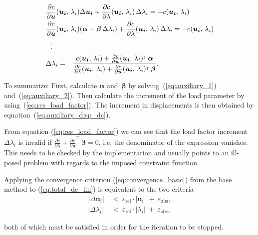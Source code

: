 %
\begin{align}
&\frac{\partial c}{\partial \boldsymbol{u}}(\boldsymbol{u_{i}},\,\lambda_{i})\Delta\boldsymbol{u_{i}} + \frac{\partial c}{\partial \lambda}(\boldsymbol{u_{i}},\,\lambda_{i})\,\Delta \lambda_{i} = -c(\boldsymbol{u_{i}},\,\lambda_{i})\notag\\
&\frac{\partial c}{\partial \boldsymbol{u}}(\boldsymbol{u_{i}},\,\lambda_{i})(\boldsymbol{\alpha} + \boldsymbol{\beta}\,\Delta \lambda_{i}) + \frac{\partial c}{\partial \lambda}(\boldsymbol{u_{i}},\,\lambda_{i})\,\Delta \lambda_{i} = -c(\boldsymbol{u_{i}},\,\lambda_{i})\notag\\
&\ \ \vdots\notag\\
&\Delta \lambda_{i} = -\frac{c(\boldsymbol{u_{i}},\,\lambda_{i}) + \frac{\partial c}{\partial \boldsymbol{u}}(\boldsymbol{u_{i}},\,\lambda_{i})^\intercal\,\boldsymbol{\alpha}}{\frac{\partial c}{\partial \lambda}(\boldsymbol{u_{i}},\,\lambda_{i}) + \frac{\partial c}{\partial \boldsymbol{u}}(\boldsymbol{u_{i}},\,\lambda_{i})^\intercal\,\boldsymbol{\beta}}.\label{eq:res_load_factor}
\end{align}

To summarize: First, calculate $\boldsymbol{\alpha}$ and~$\boldsymbol{\beta}$ by solving~(\ref{eq:auxiliary_1}) and~(\ref{eq:auxiliary_2}). Then calculate the increment of the load parameter by using~(\ref{eq:res_load_factor}). The increment in displacements is then obtained by equation~(\ref{eq:auxiliary_disp_dc}).

From equation (\ref{eq:res_load_factor}) we can see that the load factor increment $\Delta \lambda_{i}$ is invalid if $\frac{\partial c}{\partial \lambda} + \frac{\partial c}{\partial \boldsymbol{u}}^\intercal\,\boldsymbol{\beta} = 0$, i.e. the denominator of the expression vanishes.
This needs to be checked by the implementation and usually points to an ill-posed problem with regards to the imposed constraint function.


Applying the convergence criterion (\ref{eq:convergence_basic}) from the base method to (\ref{eq:total_dc_lin}) is equivalent to the two criteria
%
\begin{align}
| \Delta\boldsymbol{u}_{i} | \ &< \ \varepsilon_{\mathrm{rel}} \cdot | \boldsymbol{u}_{i} | \ + \ \varepsilon_{\mathrm{abs}}, \\
| \Delta \lambda_{i} | \ &< \ \varepsilon_{\mathrm{rel}} \cdot | \lambda_{i} | \ + \ \varepsilon_{\mathrm{abs}},
\end{align}

both of which must be satisfied in order for the iteration to be stopped.

